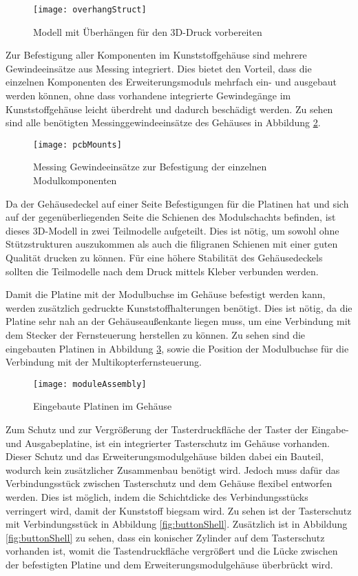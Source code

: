 \begin{figure}[h]
    \centering
    \texttt{[image: overhangStruct]}
    \caption{Modell mit Überhängen für den 3D-Druck vorbereiten}
    \label{fig:overhangStruct}
\end{figure}

Zur Befestigung aller Komponenten im Kunststoffgehäuse sind mehrere Gewindeeinsätze aus Messing integriert. Dies bietet den Vorteil, dass die einzelnen Komponenten des Erweiterungsmoduls mehrfach ein- und ausgebaut werden können, ohne dass vorhandene integrierte Gewindegänge im Kunststoffgehäuse leicht überdreht und dadurch beschädigt werden. Zu sehen sind alle benötigten Messinggewindeeinsätze des Gehäuses in Abbildung \ref{fig:pcbMounts}.

\begin{figure}[h]
    \centering
    \texttt{[image: pcbMounts]}
    \caption{Messing Gewindeeinsätze zur Befestigung der einzelnen Modulkomponenten}
    \label{fig:pcbMounts}
\end{figure}

Da der Gehäusedeckel auf einer Seite Befestigungen für die Platinen hat und sich auf der gegenüberliegenden Seite die Schienen des Modulschachts befinden, ist dieses 3D-Modell in zwei Teilmodelle aufgeteilt. Dies ist nötig, um sowohl ohne Stützstrukturen auszukommen als auch die filigranen Schienen mit einer guten Qualität drucken zu können. Für eine höhere Stabilität des Gehäusedeckels sollten die Teilmodelle nach dem Druck mittels Kleber verbunden werden.

Damit die Platine mit der Modulbuchse im Gehäuse befestigt werden kann, werden zusätzlich gedruckte Kunststoffhalterungen benötigt. Dies ist nötig, da die Platine sehr nah an der Gehäuseaußenkante liegen muss, um eine Verbindung mit dem Stecker der Fernsteuerung herstellen zu können. Zu sehen sind die eingebauten Platinen in Abbildung \ref{fig:moduleAssembly}, sowie die Position der Modulbuchse für die Verbindung mit der Multikopterfernsteuerung.

\begin{figure}[h]
    \centering
    \texttt{[image: moduleAssembly]}
    \caption{Eingebaute Platinen im Gehäuse}
    \label{fig:moduleAssembly}
\end{figure}

Zum Schutz und zur Vergrößerung der Tasterdruckfläche der Taster der Eingabe- und Ausgabeplatine, ist ein integrierter Tasterschutz im Gehäuse vorhanden. Dieser Schutz und das Erweiterungsmodulgehäuse bilden dabei ein Bauteil, wodurch kein zusätzlicher Zusammenbau benötigt wird. Jedoch muss dafür das Verbindungsstück zwischen Tasterschutz und dem Gehäuse flexibel entworfen werden. Dies ist möglich, indem die Schichtdicke des Verbindungsstücks verringert wird, damit der Kunststoff biegsam wird. Zu sehen ist der Tasterschutz mit Verbindungsstück in Abbildung \ref{fig:buttonShell}. Zusätzlich ist in Abbildung \ref{fig:buttonShell} zu sehen, dass ein konischer Zylinder auf dem Tasterschutz vorhanden ist, womit die Tastendruckfläche vergrößert und die Lücke zwischen der befestigten Platine und dem Erweiterungsmodulgehäuse überbrückt wird.

